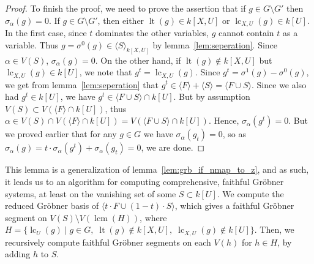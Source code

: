 \documentclass[a4paper, 12pt]{article}
\DeclareMathOperator{\LT}{lt}
\DeclareMathOperator{\LC}{lc}
\DeclareMathOperator{\lcm}{lcm}
\theoremstyle{changedot}
\theoremstyle{changedotbreak}
\theoremstyle{nonumberplain}
\newtheorem{proof}{Proof}
\begin{document}
\begin{proof}
  To finish the proof, we need to prove the assertion that if $g \in G \setminus G'$ then $\sigma_{\alpha}(g) = 0$. If $g \in G \setminus G'$, then either $\LT(g) \in k[X, U]$ or $\LC_{X, U}(g) \in k[U]$. In the first case, since $t$ dominates the other variables, $g$ cannot contain $t$ as a variable. Thus $g = \sigma^{0}(g) \in \langle S \rangle_{k[X, U]}$ by lemma~\ref{lem:seperation}. Since $\alpha \in V(S)$, $\sigma_{\alpha}(g) = 0$. On the other hand, if $\LT(g) \notin k[X, U]$ but $\LC_{X, U}(g) \in k[U]$, we note that $g^{t} = \LC_{X, U}(g)$. Since $g^{t} = \sigma^{1}(g) - \sigma^{0}(g)$, we get from lemma~\ref{lem:seperation} that $g^{t} \in \langle F \rangle + \langle S \rangle = \langle F \cup S \rangle$. Since we also had $g^{t} \in k[U]$, we have $g^{t} \in \langle F \cup S \rangle \cap k[U]$. But by assumption $V(S) \subset V(\langle F \rangle \cap k[U])$, thus $\alpha \in V(S) \cap V(\langle F \rangle \cap k[U]) = V(\langle F \cup S \rangle \cap k[U])$. Hence, $\sigma_{\alpha}(g^{t}) = 0$. But we proved earlier that for any $g \in G$ we have $\sigma_{\alpha}(g_{t}) = 0$, so as $\sigma_{\alpha}(g) = t\cdot \sigma_{\alpha}(g^{t}) + \sigma_{\alpha}(g_{t}) = 0$, we are done.
\end{proof}

This lemma is a generalization of lemma~\ref{lem:grb_if_nmap_to_z}, and as such, it leads us to an algorithm for computing comprehensive, faithful Gröbner systems, at least on the vanishing set of some $S \subset k[U]$. We compute the reduced Gröbner basis of $\langle t\cdot F \cup (1-t)\cdot S \rangle$, which gives a faithful Gröbner segment on $V(S) \setminus V(\lcm(H))$, where $H = \{\LC_{U}(g) \mid g \in G,\; \LT(g) \notin k[X, U],\; \LC_{X, U}(g) \notin k[U]\}$. Then, we recursively compute faithful Gröbner segments on each $V(h)$ for $h \in H$, by adding $h$ to $S$.
\end{document}
